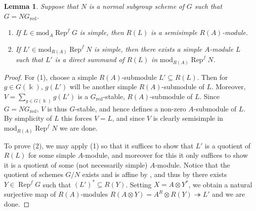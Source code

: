 \documentclass[11pt]{amsart}
\def\mod{\mathrm{ mod}}
\def\Rep{\operatorname{Rep}}
\def\sub{\subseteq}
\def\onto{\twoheadrightarrow}
\newtheorem{lemma}[thm]{Lemma}
\theoremstyle{definition}
\theoremstyle{remark}
\numberwithin{equation}{section}
\begin{document}


\begin{lemma}\label{lemma res semisimple}
    Suppose that $N$ is a normal subgroup scheme of $G$ such that $G=NG_{\mathrm{red}}$.  \begin{enumerate}
        \item If $L\in\mod_A\Rep^f G$ is simple, then $R(L)$ is a semisimple $R(A)$-module.
        \item If $L'\in\mod_{R(A)}\Rep^f N$ is simple, then there exists a simple $A$-module $L$ such that $L'$ is a direct summand of $R(L)$ in $\mod_{R(A)}\Rep^f N$.
    \end{enumerate}
\end{lemma}

\begin{proof}
    For (1), choose a simple $R(A)$-submodule $L'\sub R(L)$.  Then for $g\in G(\Bbbk)$, $g(L')$ will be another simple $R(A)$-submodule of $L$.  Moreover, $V=\sum\limits_{g\in G(\Bbbk)}g(L')$ is a $G_{\mathrm{red}}$-stable, $R(A)$-submodule of $L$.  Since $G=NG_{\mathrm{red}}$, $V$ is thus $G$-stable, and hence defines a non-zero $A$-submodule of $L$.  By simplicity of $L$ this forces $V=L$, and since $V$ is clearly semisimple in $\mod_{R(A)}\Rep^f N$ we are done.

     To prove (2), we may apply (1) so that it suffices to show that $L'$ is a quotient of $R(L)$ for some simple $A$-module, and moreover for this it only suffices to show it is a quotient of some (not necessarily simple) $A$-module.  Notice that the quotient of schemes $G/N$ exists and is affine by \cite[Cor.~7.10]{CS}, and thus by \cite[Thm.~7.3.1]{C2} there exists $Y\in\Rep^fG$ such that $(L')^*\sub R(Y)$.  Setting $X=A\otimes Y^*$, we obtain a natural surjective map of $R(A)$-modules $R(A\otimes Y)=A^{R}\otimes R( Y)\onto L'$ and we are done.
\end{proof}
\end{document}
